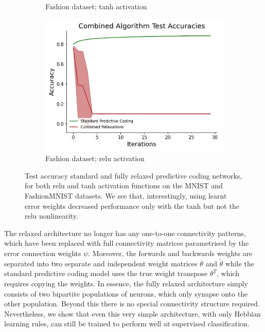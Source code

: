 \begin{figure}[ht]
\begin{subfigure}[b]{0.5\linewidth}
    \caption{\small Fashion dataset; tanh activation} 
  \end{subfigure}%
  \begin{subfigure}[b]{0.5\linewidth}
    \centering
    \includegraphics[width=0.75\linewidth]{chapter_3_figures/fashion_relu_Combined_Algorithm_Test_Accuracies_prelim_2.jpg} 
    \caption{\small Fashion dataset; relu activation} 
  \end{subfigure} 
  \caption{Test accuracy standard and fully relaxed predictive coding networks, for both relu and tanh activation functions on the MNIST and FashionMNIST datasets. We see that, interestingly, using learnt error weights decreased performance only with the tanh but not the relu nonlinearity.}
  
\label{fully_relaxed_results_figure}
\end{figure} 

The relaxed architecture no longer has any one-to-one connectivity patterns, which have been replaced with full connectivity matrices parametrised by the error connection weights $\psi$. Moreover, the forwards and backwards weights are separated into two separate and independent weight matrices $\theta$ and $\tilde{\theta}$ while the standard predictive coding model uses the true weight transpose $\theta^T$, which requires copying the weights. In essence, the fully relaxed architecture simply consists of two bipartite populations of neurons, which only synapse onto the other population. Beyond this there is no special connectivity structure required. Nevertheless, we show that even this very simple architecture, with only Hebbian learning rules, can still be trained to perform well at supervised classification.

